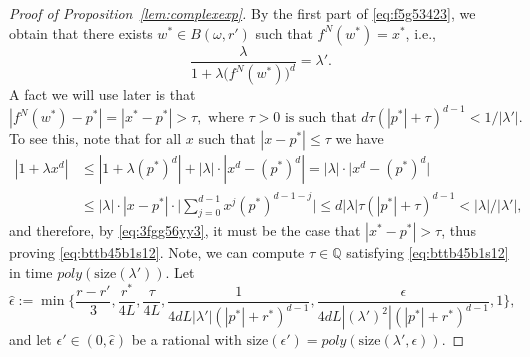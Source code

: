 \documentclass[11pt]{article}
\def\QQ{\mathbb{Q}}
\newcommand{\size}[1]{\mathrm{size}(#1)}
\begin{document}
\begin{proof}[Proof of Proposition~\ref{lem:complexexp}]
By the first part of \eqref{eq:f5g53423}, we obtain that there exists $w^*\in  B(\omega,r')$ such that $f^{N}(w^*)=x^*$, i.e., 
\begin{equation}\label{eq:6445g5h4}
\frac{\lambda}{1+\lambda \big(f^{N}(w^*)\big)^{d}}=\lambda'.
\end{equation}
A fact we will use later is that 
\begin{equation}\label{eq:bttb45b1s12}
|f^{N}(w^*)-p^*|=|x^*-p^*|> \tau, \mbox{ where } \tau>0\mbox{ is such that }d \tau (|p^*|+\tau)^{d-1}<  1/|\lambda'|.
\end{equation} 
To see this, note that for all $x$ such that $|x-p^*|\leq \tau$ we have 
\begin{align*}
|1+\lambda x^{d}|&\leq |1+\lambda (p^*)^d|+|\lambda|\cdot|x^{d}- (p^*)^d|=|\lambda|\cdot \big|x^{d}- (p^*)^d\big|&
\\&\leq |\lambda|\cdot |x-p^*|\cdot\Big|\sum^{d-1}_{j=0}x^j(p^*)^{d-1-j}\Big| \leq d |\lambda| \tau (|p^*|+\tau)^{d-1}< |\lambda|/|\lambda'|,
\end{align*}
and therefore, by \eqref{eq:3fgg56yy3}, it must be the case that $|x^*-p^*|> \tau$, thus proving \eqref{eq:bttb45b1s12}. Note, we can compute $\tau\in \QQ$ satisfying \eqref{eq:bttb45b1s12} in time $poly(\size{\lambda'})$. Let 
\[\hat{\epsilon}:=\min\Big\{\frac{r-r'}{3},\frac{r^*}{4L},\frac{\tau}{4L},\frac{1}{4d L|\lambda'|(|p^*|+r^*)^{d-1}},\frac{\epsilon}{4d L|(\lambda')^2|(|p^*|+r^*)^{d-1}}, 1\Big\},\] 
and let $\epsilon'\in (0,\hat{\epsilon})$ be a rational  with $\size{\epsilon'}=poly(\size{\lambda',\epsilon})$. 


\end{proof}
\end{document}
